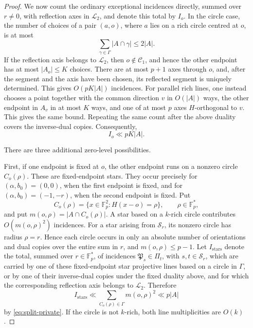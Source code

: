 \documentclass[11pt]{article}
\newcommand{\F}{\mathbb F}
\begin{document}
\begin{proof}
We now count the ordinary exceptional incidences directly, summed over $r\ne0$, with reflection axes in $\mathcal L_2$, and denote this total by $I_o$.  In the circle case, the number of choices of a pair $(a,o)$, where $a$ lies on a rich circle centred at $o$, is at most
\[
\sum_{\gamma\in\Gamma}|A\cap\gamma|\le2|A|.
\]
If the reflection axis belongs to $\mathcal L_2$, then $o\notin\mathcal C_1$, and hence the other endpoint has at most
$|A_o|\le K$ choices.  There are at most $p+1$ axes through $o$, and, after the segment and the axis have been chosen, its reflected segment is uniquely determined.  This gives $O(pK|A|)$ incidences. For parallel rich lines, one instead chooses a point together with the common direction $v$ in $O(|A|)$ ways, the other endpoint in $A_v$ in at most $K$ ways, and one of at most $p$ axes $H$-orthogonal to $v$.  This gives the same bound.  Repeating the same count after the above duality covers the inverse-dual copies. Consequently,
\begin{equation} \label{eq:split-ordinary-exceptional}
 I_o\ll pK|A|.
\end{equation}


There are three additional zero-level possibilities.

First, if one endpoint is fixed at $o$, the other endpoint runs on a nonzero circle $C_o(\rho)$.  These are fixed-endpoint stars. 
They occur precisely for
$(\alpha,b_0)=(0,0)$, when the first endpoint is fixed, and for
$(\alpha,b_0)=(-1,-r)$, when the second endpoint is fixed. 
Put
\[
 C_o(\rho)=\{x\in\F_p^2:H(x-o)=\rho\},
 \qquad \rho\in\F_p^*,
\]
and put $m(o,\rho)=|A\cap C_o(\rho)|$. A star based on a $k$-rich circle contributes $O(m(o,\rho)^2)$ incidences.  For a star arising from $\mathcal S_r$, its nonzero circle has radius $\rho=r$.  Hence each circle occurs in only an absolute number of orientations and dual copies over the entire
sum in $r$, and $m(o,\rho)\le p-1$. Let $I_{\mathrm{stars}}$ denote the total, summed over
$r\in\F_p^*$, of incidences $\mathfrak P_s\in\Pi_t$, with
$s,t\in\mathcal S_r$, which are carried by one of these fixed-endpoint
star projective lines based on a circle in $\Gamma$, or by one of their
inverse-dual copies under the fixed duality above, and for which the
corresponding reflection axis belongs to $\mathcal L_2$. Therefore
\begin{equation} \label{eq:split-stars}
I_{\mathrm{stars}} \ll\sum_{C_o(\rho)\in\Gamma}m(o,\rho)^2\ll p|A|
\end{equation}
by \eqref{eq:split-private}.  If the circle is not $k$-rich, both line multiplicities are $O(k)$.


\end{proof}
\end{document}
